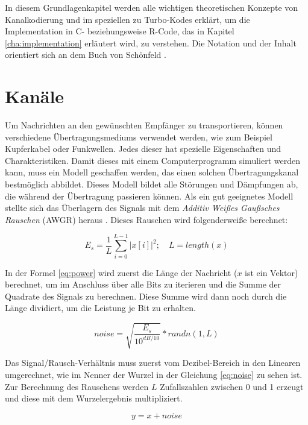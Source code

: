 In diesem Grundlagenkapitel werden alle wichtigen theoretischen Konzepte von Kanalkodierung und im speziellen zu Turbo-Kodes erklärt, um die Implementation in C- beziehungsweise R-Code, das in Kapitel \ref{cha:implementation} erläutert wird, zu verstehen. Die Notation und der Inhalt orientiert sich an dem Buch von Schönfeld \cite{schoenfeld2012informations}.

\section{Kanäle}
\label{sec:channels}
Um Nachrichten an den gewünschten Empfänger zu transportieren, können verschiedene Übertragungsmediums verwendet werden, wie zum Beispiel Kupferkabel oder Funkwellen. Jedes dieser hat spezielle Eigenschaften und Charakteristiken. Damit dieses mit einem Computerprogramm simuliert werden kann, muss ein Modell geschaffen werden, das einen solchen Übertragungskanal bestmöglich abbildet. Dieses Modell bildet alle Störungen und Dämpfungen ab, die während der Übertragung passieren können. Als ein gut geeignetes Modell stellte sich das Überlagern des Signals mit dem \emph{Additiv Weißes Gaußsches Rauschen} (AWGR) heraus \cite[81]{schoenfeld2012informations}. Dieses Rauschen wird folgenderweiße berechnet:

\begin{equation}
E_s = \frac{1}{L} \displaystyle\sum_{i=0}^{L-1} |x[i]|^2; \quad L = length(x)
\label{eq:power}
\end{equation}

In der Formel \ref{eq:power} wird zuerst die Länge der Nachricht ($x$ ist ein Vektor) berechnet, um im Anschluss über alle Bits zu iterieren und die Summe der Quadrate des Signals zu berechnen. Diese Summe wird dann noch durch die Länge dividiert, um die Leistung je Bit zu erhalten.

\begin{equation}
noise = \sqrt{\frac{E_s}{10^{dB/10}}} * randn(1,L)
\label{eq:noise}
\end{equation}

Das Signal/Rausch-Verhältnis muss zuerst vom Dezibel-Bereich in den Linearen umgerechnet, wie im Nenner der Wurzel in der Gleichung \ref{eq:noise} zu sehen ist.
Zur Berechnung des Rauschens werden $L$ Zufallszahlen zwischen 0 und 1 erzeugt und diese mit dem Wurzelergebnis multipliziert. 

\begin{equation}
y = x + noise
\label{eq:noisySignal}
\end{equation}

